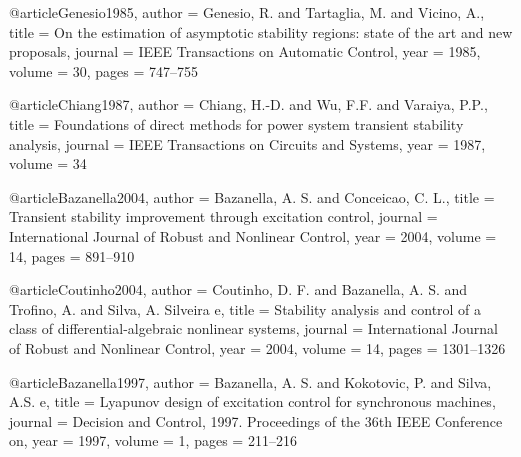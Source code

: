 @article{Genesio1985,
  author = {Genesio, R. and Tartaglia, M. and Vicino, A.},
  title = {On the estimation of asymptotic stability regions: state of the art and new proposals},
  journal = {IEEE Transactions on Automatic Control},
  year = {1985},
  volume = {30},
  pages = {747--755}
}

@article{Chiang1987,
  author = {Chiang, H.-D. and Wu, F.F. and Varaiya, P.P.},
  title = {Foundations of direct methods for power system transient stability analysis},
  journal = {IEEE Transactions on Circuits and Systems},
  year = {1987},
  volume = {34}
}

@article{Bazanella2004,
  author = {Bazanella, A. S. and Conceicao, C. L.},
  title = {Transient stability improvement through excitation control},
  journal = {International Journal of Robust and Nonlinear Control},
  year = {2004},
  volume = {14},
  pages = {891--910}
}

@article{Coutinho2004,
  author = {Coutinho, D. F. and Bazanella, A. S. and Trofino, A. and Silva, A. Silveira e},
  title = {Stability analysis and control of a class of differential-algebraic nonlinear systems},
  journal = {International Journal of Robust and Nonlinear Control},
  year = {2004},
  volume = {14},
  pages = {1301--1326}
}

@article{Bazanella1997,
  author = {Bazanella, A. S. and Kokotovic, P. and Silva, A.S. e},
  title = {Lyapunov design of excitation control for synchronous machines},
  journal = {Decision and Control, 1997. Proceedings of the 36th IEEE Conference on},
  year = {1997},
  volume = {1},
  pages = {211--216}
}

